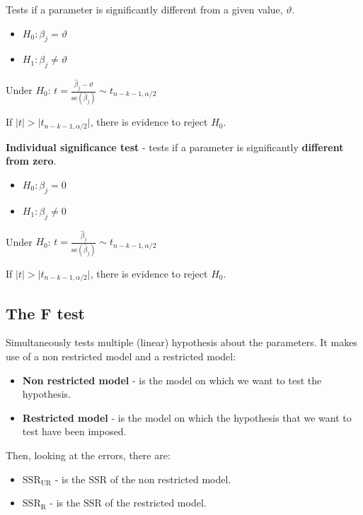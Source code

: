 \documentclass[10pt, a4paper, landscape]{extarticle}
\newcommand{\se}{\mathrm{se}}
\newcommand{\SSR}{\mathrm{SSR}}
\begin{document}
\begin{multicols}{3}
Tests if a parameter is significantly different from a given value, $\vartheta$.

\begin{itemize}[leftmargin=*]
	\item $H_0: \beta_j = \vartheta$
	\item $H_1: \beta_j \neq \vartheta$
\end{itemize}

\begin{center}
	Under $H_0$: \quad $t = \frac{\hat{\beta}_j - \vartheta}{\se(\hat{\beta}_j)} \sim t_{n - k - 1, \alpha/2}$
\end{center}

If $\lvert t \rvert > \lvert t_{n - k - 1, \alpha/2} \rvert$, there is evidence to reject $H_0$.

\textbf{Individual significance test} - tests if a parameter is significantly \textbf{different from zero}.

\begin{itemize}[leftmargin=*]
	\item $H_0: \beta_j = 0$
	\item $H_1: \beta_j \neq 0$
\end{itemize}

\begin{center}
	Under $H_0$: \quad $t = \frac{\hat{\beta}_j}{\se(\hat{\beta}_j)} \sim t_{n - k - 1, \alpha/2}$
\end{center}

If $\lvert t \rvert > \lvert t_{n - k - 1, \alpha/2} \rvert$, there is evidence to reject $H_0$.

\subsection*{The F test}

Simultaneously tests multiple (linear) hypothesis about the parameters. It makes use of a non restricted model and a restricted model:

\begin{itemize}[leftmargin=*]
	\item \textbf{Non restricted model} - is the model on which we want to test the hypothesis.
	\item \textbf{Restricted model} - is the model on which the hypothesis that we want to test have been imposed.
\end{itemize}

Then, looking at the errors, there are:

\begin{itemize}[leftmargin=*]
	\item \textbf{$\SSR_\mathrm{UR}$} - is the $\SSR$ of the non restricted model.
	\item \textbf{$\SSR_\mathrm{R}$} - is the $\SSR$ of the restricted model.
\end{itemize}


\end{multicols}
\end{document}
